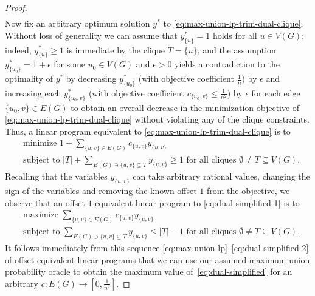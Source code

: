 \documentclass[11pt]{article}
\begin{document}
\begin{proof}
\begin{equation}
\begin{split}
\end{split}
\end{equation}
Now fix an arbitrary optimum solution $y^*$ to \eqref{eq:max-union-lp-trim-dual-clique}. Without loss of generality we can assume that 
$y^*_{\{u\}}=1$ holds for all $u\in V(G)$; 
indeed, $y^*_{\{u\}}\geq 1$ is immediate by the clique $T=\{u\}$, and 
the assumption $y^*_{\{u_0\}}=1+\epsilon$ for some $u_0\in V(G)$
and $\epsilon>0$ yields a contradiction to the optimality of 
$y^*$ by decreasing $y^*_{\{u_0\}}$ (with objective coefficient $\frac{1}{n}$) 
by $\epsilon$ and increasing each $y^*_{\{u_0,v\}}$ 
(with objective coefficient $c_{\{u_0,v\}}\leq\frac{1}{n^2}$)
by $\epsilon$ for each edge $\{u_0,v\}\in E(G)$ 
to obtain an overall decrease in the minimization objective of 
\eqref{eq:max-union-lp-trim-dual-clique} without 
violating any of the clique constraints.
Thus, a linear program equivalent to \eqref{eq:max-union-lp-trim-dual-clique}
is to
\begin{equation}
\label{eq:dual-simplified-1}
\begin{split}
&\text{minimize $1+\sum_{\{u,v\}\in E(G)}c_{\{u,v\}}y_{\{u,v\}}$}\\
&\text{subject to $|T|+\sum_{E(G)\ni \{u,v\}\subseteq T}y_{\{u,v\}}\geq 1$ 
for all cliques $\emptyset\neq T\subseteq V(G)$}. 
\end{split}
\end{equation}
Recalling that the variables 
$y_{\{u,v\}}$ can take arbitrary rational values, changing the sign 
of the variables and removing the known offset $1$ from the objective, 
we observe that an offset-$1$-equivalent linear program 
to \eqref{eq:dual-simplified-1} is to 
\begin{equation}
\label{eq:dual-simplified-2}
\begin{split}
&\text{maximize $\sum_{\{u,v\}\in E(G)}c_{\{u,v\}}y_{\{u,v\}}$}\\
&\text{subject to $\sum_{E(G)\ni \{u,v\}\subseteq T}y_{\{u,v\}}\leq |T|-1$ 
for all cliques $\emptyset\neq T\subseteq V(G)$}.
\end{split}
\end{equation}
It follows immediately from this sequence \eqref{eq:max-union-lp}--\eqref{eq:dual-simplified-2} of offset-equivalent linear programs
that we can use our assumed maximum union probability oracle to obtain 
the maximum value of~\eqref{eq:dual-simplified} 
for an arbitrary $c:E(G)\rightarrow [0,\frac{1}{n^2}]$.


\end{proof}
\end{document}
